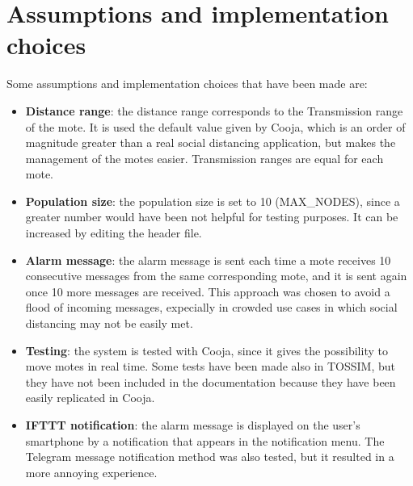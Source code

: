 \documentclass[11pt]{article}
\begin{document}
\section{Assumptions and implementation choices}
Some assumptions and implementation choices that have been made are:
\begin{itemize}
  \item \textbf{Distance range}: the distance range corresponds to the Transmission range of the mote. It is used the default value given by Cooja, which is an order of magnitude greater than a real social distancing application, but makes the management of the motes easier. Transmission ranges are equal for each mote.
  \item \textbf{Population size}: the population size is set to 10 (MAX\_NODES), since a greater number would have been not helpful for testing purposes. It can be increased by editing the header file.
  \item \textbf{Alarm message}: the alarm message is sent each time a mote receives 10 consecutive messages from the same corresponding mote, and it is sent again once 10 more messages are received. This approach was chosen to avoid a flood of incoming messages, expecially in crowded use cases in which social distancing may not be easily met.
  \item \textbf{Testing}: the system is tested with Cooja, since it gives the possibility to move motes in real time. Some tests have been made also in TOSSIM, but they have not been included in the documentation because they have been easily replicated in Cooja.
  \item \textbf{IFTTT notification}: the alarm message is displayed on the user's smartphone by a notification that appears in the notification menu. The Telegram message notification method was also tested, but it resulted in a more annoying experience.
\end{itemize}
\end{document}
